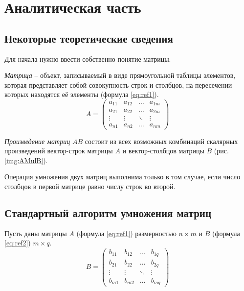\chapter{Аналитическая часть}

\section{Некоторые теоретические сведения}

Для начала нужно ввести собственно понятие матрицы.

\textit{Матрица} -- объект, записываемый в виде прямоугольной таблицы элементов,
которая представляет собой совокупность строк и столбцов, на пересечении которых находятся её элементы (формула \ref{eq:ref1}).
\begin{equation}
	A = \left(
	\begin{array}{cccc}
			a_{11} & a_{12} & \ldots & a_{1m} \\
			a_{21} & a_{22} & \ldots & a_{2m} \\
			\vdots & \vdots & \ddots & \vdots \\
			a_{n1} & a_{n2} & \ldots & a_{nm}
		\end{array}
	\right)
	\label{eq:ref1}
\end{equation}

\textit{Произведение матриц} $AB$ состоит из всех возможных комбинаций скалярных произведений 
вектор-строк матрицы $A$ и вектор-столбцов матрицы $B$ (рис. \ref{img:AMulB}).


Операция умножения двух матриц выполнима только в том случае, если число столбцов в первой матрице равно числу строк во второй.

\section{Стандартный алгоритм умножения матриц}
Пусть даны матрицы $A$ (формула \ref{eq:ref1}) размерностью $n \times m$ и $B$ (формула \ref{eq:ref2}) $m \times q$.
\begin{equation}
	B = \left(
	\begin{array}{cccc}
			b_{11} & b_{12} & \ldots & b_{1q} \\
			b_{21} & b_{22} & \ldots & b_{2q} \\
			\vdots & \vdots & \ddots & \vdots \\
			b_{m1} & b_{m2} & \ldots & b_{mq}
		\end{array}
	\right)
	\label{eq:ref2}
\end{equation}

